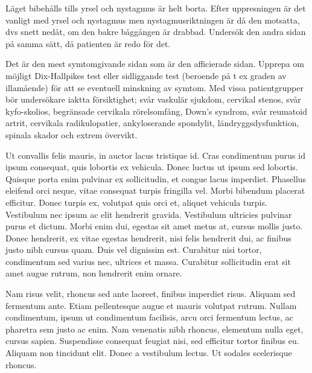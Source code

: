 Läget bibehålls tills yrsel och nystagmus är helt borta. Efter uppresningen är det vanligt med yrsel och nystagmus men nystagmusriktningen är då den motsatta, dvs snett nedåt, om den bakre båggången är drabbad. Undersök den andra sidan på samma sätt, då patienten är redo för det. 

Det är den mest symtomgivande sidan som är den afficierade sidan. Upprepa om möjligt Dix-Hallpikes test eller sidliggande test (beroende på t ex graden av illamående) för att se eventuell minskning av symtom. Med vissa patientgrupper bör undersökare iaktta försiktighet; svår vaskulär sjukdom, cervikal stenos, svår kyfo-skolios, begränsade cervikala rörelsomfång, Down’s syndrom, svår reumatoid artrit, cervikala radikulopatier, ankyloserande spondylit, ländryggsdysfunktion, spinala skador och extrem övervikt.

\newcount\piclines
\newcount\picafterline
{}

Ut convallis felis mauris, in auctor lacus tristique id. Cras condimentum purus id ipsum consequat, quis lobortis ex vehicula. Donec luctus ut ipsum sed lobortis. Quisque porta enim pulvinar ex sollicitudin, et congue lacus imperdiet. Phasellus eleifend orci neque, vitae consequat turpis fringilla vel. Morbi bibendum placerat efficitur. Donec turpis ex, volutpat quis orci et, aliquet vehicula turpis.
Vestibulum nec ipsum ac elit hendrerit gravida. Vestibulum ultricies pulvinar purus et dictum. Morbi enim dui, egestas sit amet metus at, cursus mollis justo. Donec hendrerit, ex vitae egestas hendrerit, nisi felis hendrerit dui, ac finibus justo nibh cursus quam. Duis vel dignissim est. Curabitur nisi tortor, condimentum sed varius nec, ultrices et massa. Curabitur sollicitudin erat sit amet augue rutrum, non hendrerit enim ornare.

Nam risus velit, rhoncus sed ante laoreet, finibus imperdiet risus. Aliquam sed fermentum ante. Etiam pellentesque augue et mauris volutpat rutrum. Nullam condimentum, ipsum ut condimentum facilisis, arcu orci fermentum lectus, ac pharetra sem justo ac enim. Nam venenatis nibh rhoncus, elementum nulla eget, cursus sapien. Suspendisse consequat feugiat nisi, sed efficitur tortor finibus eu. Aliquam non tincidunt elit. Donec a vestibulum lectus. Ut sodales scelerisque rhoncus. 




